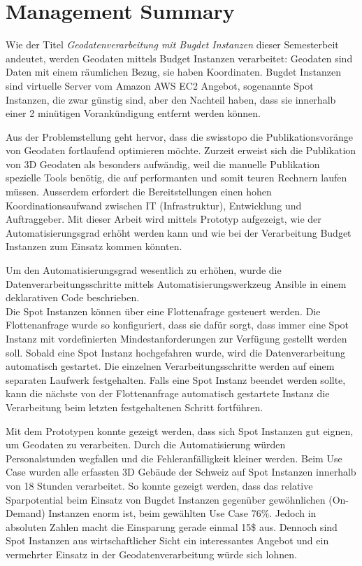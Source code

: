 \section{Management Summary}
Wie der Titel \emph{Geodatenverarbeitung mit Bugdet Instanzen} dieser Semesterbeit andeutet, werden Geodaten mittels Budget Instanzen verarbeitet: Geodaten sind Daten mit einem räumlichen Bezug, sie haben Koordinaten. Bugdet Instanzen sind virtuelle Server vom Amazon AWS EC2 Angebot, sogenannte Spot Instanzen, die zwar günstig sind, aber den Nachteil haben, dass sie innerhalb einer 2 minütigen Vorankündigung entfernt werden können.

Aus der Problemstellung geht hervor, dass die swisstopo die Publikationsvoränge von Geodaten fortlaufend optimieren möchte. Zurzeit erweist sich die Publikation von 3D Geodaten als besonders aufwändig, weil die manuelle Publikation spezielle Tools benötig, die auf performanten und somit teuren Rechnern laufen müssen. Ausserdem erfordert die Bereitstellungen einen hohen Koordinationsaufwand zwischen IT (Infrastruktur), Entwicklung und Auftraggeber.
Mit dieser Arbeit wird mittels Prototyp aufgezeigt, wie der Automatisierungsgrad erhöht werden kann und wie bei der Verarbeitung Budget Instanzen zum Einsatz kommen könnten.

Um den Automatisierungsgrad wesentlich zu erhöhen, wurde die Datenverarbeitungsschritte mittels Automatisierungswerkzeug Ansible in einem deklarativen Code beschrieben.\\ Die Spot Instanzen können über eine Flottenafrage gesteuert werden. Die Flottenanfrage wurde so konfiguriert, dass sie dafür sorgt, dass immer eine Spot Instanz mit vordefinierten Mindestanforderungen zur Verfügung gestellt werden soll. Sobald eine Spot Instanz hochgefahren wurde, wird die Datenverarbeitung automatisch gestartet.
Die einzelnen Verarbeitungsschritte werden auf einem separaten Laufwerk festgehalten. Falls eine Spot Instanz beendet werden sollte, kann die nächste von der Flottenanfrage automatisch gestartete Instanz die Verarbeitung beim letzten festgehaltenen Schritt fortführen.

Mit dem Prototypen konnte gezeigt werden, dass sich Spot Instanzen gut eignen, um Geodaten zu verarbeiten. Durch die Automatisierung würden Personalstunden wegfallen und die Fehleranfälligkeit kleiner werden. Beim Use Case wurden alle erfassten 3D Gebäude der Schweiz auf Spot Instanzen innerhalb von 18 Stunden verarbeitet.
So konnte gezeigt werden, dass das relative Sparpotential beim Einsatz von Bugdet Instanzen gegenüber gewöhnlichen (On-Demand) Instanzen enorm ist, beim gewählten Use Case 76\%. Jedoch in absoluten Zahlen macht die Einsparung gerade einmal 15\$ aus. Dennoch sind Spot Instanzen aus wirtschaftlicher Sicht ein interessantes Angebot und ein vermehrter Einsatz in der Geodatenverarbeitung würde sich lohnen.

\pagebreak